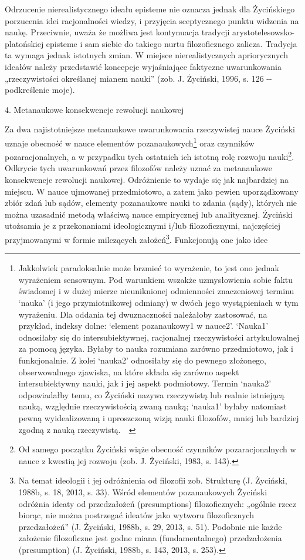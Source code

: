\documentclass{article}
\begin{document}
Odrzucenie nierealistycznego ideału episteme nie oznacza jednak dla Życińskiego porzucenia idei racjonalności wiedzy, i
przyjęcia sceptycznego punktu widzenia na naukę. Przeciwnie, uważa że możliwa jest kontynuacja tradycji
arystotelesowsko-platońskiej episteme i sam siebie do takiego nurtu filozoficznego zalicza. Tradycja ta wymaga jednak
istotnych zmian. W miejsce nierealistycznych apriorycznych ideałów należy przedstawić koncepcje wyjaśniające faktyczne
uwarunkowania „rzeczywistości określanej mianem nauki” \label{ref:RNDDRndo6NuDC}(zob. J. Życiński, 1996, s. 126 -{}-
podkreślenie moje).

4. Metanaukowe konsekwencje rewolucji naukowej

Za dwa najistotniejsze metanaukowe uwarunkowania rzeczywistej nauce Życiński uznaje obecność w nauce elementów
pozanaukowych\footnote{Jakkolwiek paradoksalnie może brzmieć to wyrażenie, to jest ono jednak wyrażeniem sensownym. Pod
warunkiem wszakże uzmysłowienia sobie faktu świadomej i w dużej mierze nieuniknionej odmienności znaczeniowej terminu
‘nauka’ (i jego przymiotnikowej odmiany) w dwóch jego wystąpieniach w tym wyrażeniu. Dla oddania tej dwuznaczności
należałoby zastosować, na przykład, indeksy dolne: ‘element pozanaukowy1 w nauce2’. ‘Nauka1’ odnosiłaby się do
intersubiektywnej, racjonalnej rzeczywistości artykułowalnej za pomocą języka. Byłaby to nauka rozumiana zarówno
przedmiotowo, jak i funkcjonalnie. Z kolei ‘nauka2’ odnosiłaby się do pewnego złożonego, obserwowalnego zjawiska, na
które składa się zarówno aspekt intersubiektywny nauki, jak i jej aspekt podmiotowy. Termin ‘nauka2’ odpowiadałby temu,
co Życiński nazywa rzeczywistą lub realnie istniejącą nauką, względnie rzeczywistością zwaną nauką; ‘nauka1’ byłaby
natomiast pewną wyidealizowaną i uproszczoną wizją nauki filozofów, mniej lub bardziej zgodną z nauką rzeczywistą.\ \ }
oraz czynników pozaracjonalnych, a w przypadku tych ostatnich ich istotną rolę rozwoju nauki\footnote{Od samego
początku Życiński wiąże obecność czynników pozaracjonalnych w nauce z kwestią jej rozwoju
\label{ref:RNDGwyI8mc6od}(zob. J. Życiński, 1983, s. 143).}. Odkrycie tych uwarunkowań przez filozofów należy uznać za
metanaukowe konsekwencje rewolucji naukowej. Odróżnienie to wydaje się jak najbardziej na miejscu. W nauce ujmowanej
przedmiotowo, a zatem jako pewien uporządkowany zbiór zdań lub sądów, elementy pozanaukowe nauki to zdania (sądy),
których nie można uzasadnić metodą właściwą nauce empirycznej lub analitycznej. Życiński utożsamia je z przekonaniami
ideologicznymi i/lub filozoficznymi, najczęściej przyjmowanymi w formie milczących założeń\footnote{Na temat ideologii
i jej odróżnienia od filozofii zob. Strukturę \label{ref:RND65JRx0WUvQ}(J. Życiński, 1988b, s. 18, 2013, s. 33). Wśród
elementów pozanaukowych Życiński odróżnia ideaty od przedzałożeń (presumptions) filozoficznych: „ogólnie rzecz biorąc,
nie można postrzegać ideatów jako wytworu filozoficznych przedzałożeń” \label{ref:RNDNBJ2x09ZUn}(J. Życiński, 1988b, s.
29, 2013, s. 51). Podobnie nie każde założenie filozoficzne jest godne miana (fundamentalnego) przedzałożenia
(presumption) \label{ref:RNDKgGZVRdQ4Q}(J. Życiński, 1988b, s. 143, 2013, s. 253).}. Funkcjonują one jako idee
\end{document}
